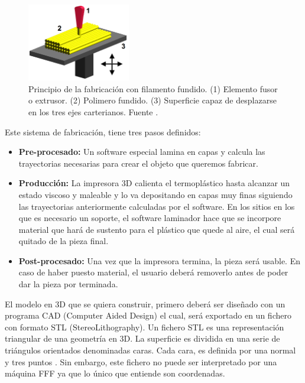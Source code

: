 \begin{figure}[h!]
    \centering
    \includegraphics[width=0.4\textwidth]{images/FDM_by_Zureks.png}
    \caption[Principio de la fabricación con filamento fundido]{Principio de la fabricación con filamento fundido. (1) Elemento fusor o extrusor. (2) Polimero fundido. (3) Superficie capaz de desplazarse en los tres ejes carterianos. Fuente \cite{fundamentoFDM}.}
    \label{fig:impr_fdm}
\end{figure}

Este sistema de fabricación, tiene tres pasos definidos:

\begin{itemize}
    \item \textbf{Pre-procesado:} Un software especial lamina en capas y calcula las trayectorias necesarias para crear el objeto que queremos fabricar.
    \item \textbf{Producción:} La impresora 3D calienta el termoplástico hasta alcanzar un estado viscoso y maleable y lo va depositando en capas muy finas siguiendo las trayectorias anteriormente calculadas por el software. En los sitios en los que es necesario un soporte, el software laminador hace que se incorpore material que hará de sustento para el plástico que quede al aire, el cual será quitado de la pieza final.
    \item \textbf{Post-procesado:} Una vez que la impresora termina, la pieza será usable. En caso de haber puesto material, el usuario deberá removerlo antes de poder dar la pieza por terminada.
\end{itemize}

El modelo en 3D que se quiera construir, primero deberá ser diseñado con un programa CAD (Computer Aided Design) el cual, será exportado en un fichero con formato STL (StereoLithography). Un fichero STL es una representación triangular de una geometría en 3D. La superficie es dividida en una serie de triángulos orientados denominadas caras. Cada cara, es definida por una normal y tres puntos \cite{stl}. Sin embargo, este fichero no puede ser interpretado por una máquina FFF ya que lo único que entiende son coordenadas.\\

